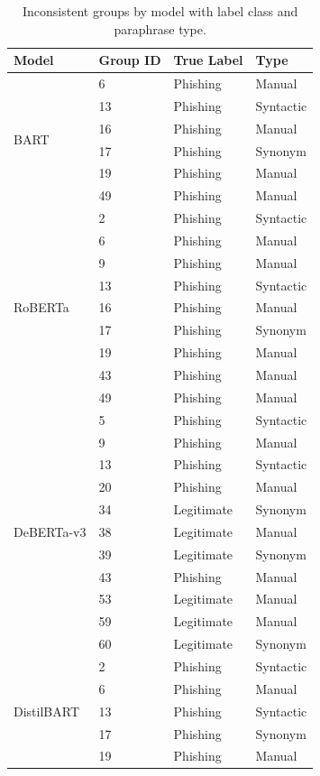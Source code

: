 \documentclass[11pt]{article}
\begin{document}
\begin{table}[h]
\centering
\small
\caption{Inconsistent groups by model with label class and paraphrase type.}
\label{tab:inconsistent_detail}
\setlength{\tabcolsep}{6pt}
\begin{tabular}{llll}
\toprule
\textbf{Model} & \textbf{Group ID} & \textbf{True Label} & \textbf{Type} \\
\midrule
\multirow{6}{*}{BART}
  & 6  & Phishing   & Manual \\
  & 13 & Phishing   & Syntactic \\
  & 16 & Phishing   & Manual \\
  & 17 & Phishing   & Synonym \\
  & 19 & Phishing   & Manual \\
  & 49 & Phishing   & Manual \\
\midrule
\multirow{9}{*}{RoBERTa}
  & 2  & Phishing   & Syntactic \\
  & 6  & Phishing   & Manual \\
  & 9  & Phishing   & Manual \\
  & 13 & Phishing   & Syntactic \\
  & 16 & Phishing   & Manual \\
  & 17 & Phishing   & Synonym \\
  & 19 & Phishing   & Manual \\
  & 43 & Phishing   & Manual \\
  & 49 & Phishing   & Manual \\
\midrule
\multirow{11}{*}{DeBERTa-v3}
  & 5  & Phishing   & Syntactic \\
  & 9  & Phishing   & Manual \\
  & 13 & Phishing   & Syntactic \\
  & 20 & Phishing   & Manual \\
  & 34 & Legitimate & Synonym \\
  & 38 & Legitimate & Manual \\
  & 39 & Legitimate & Synonym \\
  & 43 & Phishing   & Manual \\
  & 53 & Legitimate & Manual \\
  & 59 & Legitimate & Manual \\
  & 60 & Legitimate & Synonym \\
\midrule
\multirow{5}{*}{DistilBART}
  & 2  & Phishing   & Syntactic \\
  & 6  & Phishing   & Manual \\
  & 13 & Phishing   & Syntactic \\
  & 17 & Phishing   & Synonym \\
  & 19 & Phishing   & Manual \\
\bottomrule
\end{tabular}
\end{table}
\end{document}
